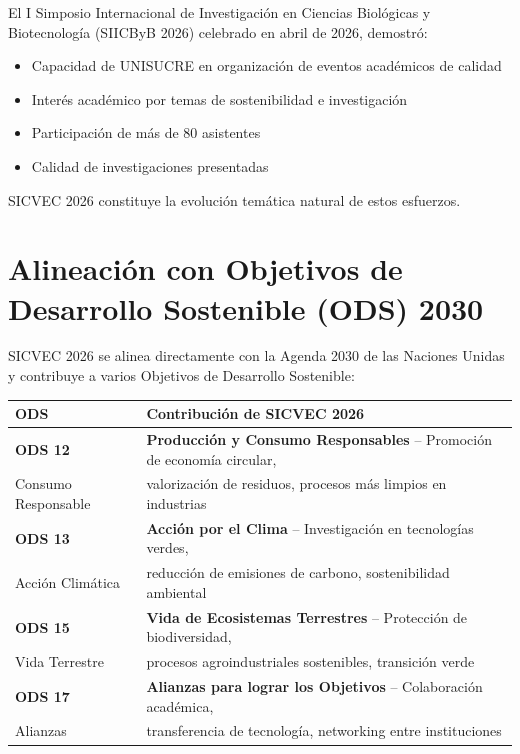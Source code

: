 \documentclass[12pt,a4paper]{article}
\begin{document}
El I Simposio Internacional de Investigación en Ciencias Biológicas y Biotecnología (SIICByB 2026) celebrado en abril de 2026, demostró:

\begin{itemize}[label={\textcolor{verdelimpio}{\textbullet}}]
  \item Capacidad de UNISUCRE en organización de eventos académicos de calidad
  \item Interés académico por temas de sostenibilidad e investigación
  \item Participación de más de 80 asistentes
  \item Calidad de investigaciones presentadas
\end{itemize}

SICVEC 2026 constituye la evolución temática natural de estos esfuerzos.

\section{Alineación con Objetivos de Desarrollo Sostenible (ODS) 2030}

SICVEC 2026 se alinea directamente con la Agenda 2030 de las Naciones Unidas y contribuye a varios Objetivos de Desarrollo Sostenible:

\begin{table}[H]
\centering
\small
\begin{tabular}{|l|p{10cm}|}
\hline
\rowcolor{verdeclaro}
\textbf{ODS} & \textbf{Contribución de SICVEC 2026} \\
\hline
\textbf{ODS 12} & \textbf{Producción y Consumo Responsables} -- Promoción de economía circular, \\
Consumo Responsable & valorización de residuos, procesos más limpios en industrias \\
\hline
\textbf{ODS 13} & \textbf{Acción por el Clima} -- Investigación en tecnologías verdes, \\
Acción Climática & reducción de emisiones de carbono, sostenibilidad ambiental \\
\hline
\textbf{ODS 15} & \textbf{Vida de Ecosistemas Terrestres} -- Protección de biodiversidad, \\
Vida Terrestre & procesos agroindustriales sostenibles, transición verde \\
\hline
\textbf{ODS 17} & \textbf{Alianzas para lograr los Objetivos} -- Colaboración académica, \\
Alianzas & transferencia de tecnología, networking entre instituciones \\
\hline
\end{tabular}
\end{table}
\end{document}

